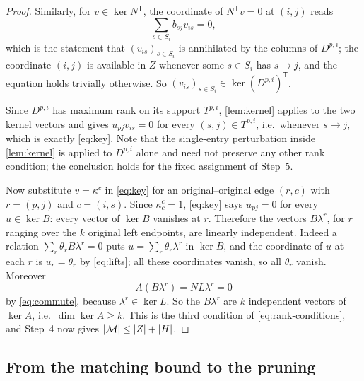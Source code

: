 \begin{proof}
Similarly, for $v\in\ker N^{\mathsf T}$, the coordinate of $N^{\mathsf T}v=0$ at $(i,j)$ reads
\begin{equation}\label{eq:col-eq}
 \sum_{s\in S_i}b_{sj}v_{is}=0 ,
\end{equation}
which is the statement that $(v_{is})_{s\in S_i}$ is annihilated by the columns of $D^{p,i}$; the
coordinate $(i,j)$ is available in $Z$ whenever some $s\in S_i$ has $s\to j$, and the equation holds
trivially otherwise. So $(v_{is})_{s\in S_i}\in\ker(D^{p,i})^{\mathsf T}$.

Since $D^{p,i}$ has maximum rank on its support $T^{p,i}$, \cref{lem:kernel} applies to the two kernel
vectors and gives $u_{pj}v_{is}=0$ for every $(s,j)\in T^{p,i}$, i.e.\ whenever $s\to j$, which is
exactly \eqref{eq:key}. Note that the single-entry perturbation inside \cref{lem:kernel} is applied to
$D^{p,i}$ alone and need not preserve any other rank condition; the conclusion holds for the fixed
assignment of Step~5.

Now substitute $v=\kappa^c$ in \eqref{eq:key} for an original--original edge $(r,c)$ with $r=(p,j)$ and
$c=(i,s)$. Since $\kappa^c_c=1$, \eqref{eq:key} says $u_{pj}=0$ for every $u\in\ker B$: every vector of
$\ker B$ vanishes at $r$. Therefore the vectors $B\lambda^r$, for $r$ ranging over the $k$ original
left endpoints, are linearly independent. Indeed a relation $\sum_r\theta_rB\lambda^r=0$ puts
$u=\sum_r\theta_r\lambda^r$ in $\ker B$, and the coordinate of $u$ at each $r$ is $u_r=\theta_r$ by
\eqref{eq:lifts}; all these coordinates vanish, so all $\theta_r$ vanish. Moreover
\[
 A(B\lambda^r)=NL\lambda^r=0
\]
by \eqref{eq:commute}, because $\lambda^r\in\ker L$. So the $B\lambda^r$ are $k$ independent vectors
of $\ker A$, i.e.\ $\dim\ker A\ge k$. This is the third condition of \eqref{eq:rank-conditions}, and
Step~4 now gives $\lvert \mathcal M\rvert\le\lvert Z\rvert+\lvert H\rvert$.

\end{proof}

\subsection{From the matching bound to the pruning}\label{sec:matching-to-pruning}

